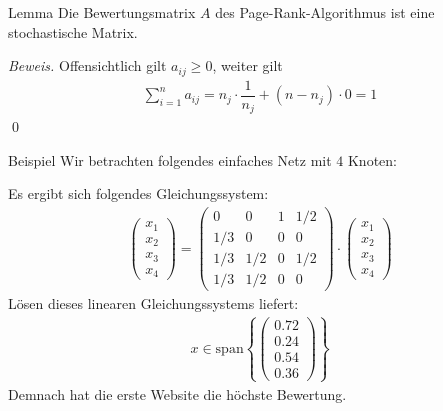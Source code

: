 \begin{colbox}{Lemma}
  Die Bewertungsmatrix $A$ des Page-Rank-Algorithmus ist eine stochastische Matrix.
\end{colbox}
\textit{Beweis.} Offensichtlich gilt $a_{ij}\geq 0$, weiter gilt
\begin{align*}\sum_{i=1}^n a_{ij} = n_j\cdot \dfrac{1}{n_j} + (n-n_j)\cdot 0 = 1\end{align*}
\qed
\begin{colbox}{Beispiel}
  Wir betrachten folgendes einfaches Netz mit $4$ Knoten: 

  \begin{center}
    
  \end{center}

  Es ergibt sich folgendes Gleichungssystem:
  \begin{align*}
    \begin{pmatrix}
      x_1\\ x_2\\ x_3\\ x_4
    \end{pmatrix} 
    = \begin{pmatrix}
      0 & 0 & 1 & 1/2 \\ 
      1/3 & 0 & 0 & 0 \\
      1/3 & 1/2 & 0 & 1/2 \\
      1/3 & 1/2 & 0 & 0
    \end{pmatrix}\cdot 
    \begin{pmatrix}
      x_1\\ x_2\\ x_3\\ x_4
    \end{pmatrix}
  \end{align*}
  Lösen dieses linearen Gleichungssystems liefert:
  \begin{align*}
    x \in \text{span}\left\{\begin{pmatrix}
    0.72 \\ 0.24 \\ 0.54 \\ 0.36
    \end{pmatrix}\right\}
  \end{align*}
  Demnach hat die erste Website die höchste Bewertung. 
\end{colbox}

